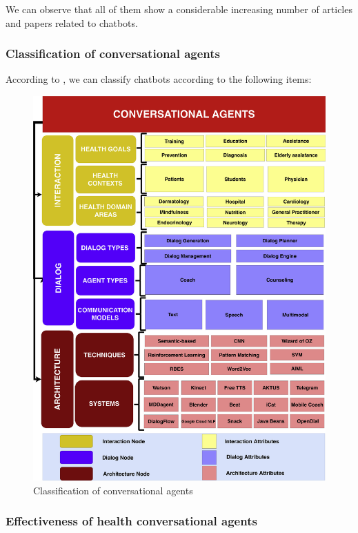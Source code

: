 \documentclass[12pt,english]{article}
\begin{document}
We can observe that all of them show a considerable increasing number of articles and papers related to chatbots.





\subsubsection{Classification of conversational agents}

According to \cite{Montenegro201956}, we can classify chatbots according to the following items:

\begin{figure}[H]
  \centering
  \includegraphics{taxonomy.jpg}
  \caption{Classification of conversational agents}
\end{figure}





\subsubsection{Effectiveness of health conversational agents}
\end{document}
